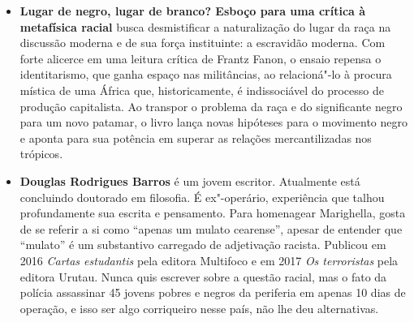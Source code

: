 \begin{itemize}


\item \textbf{Lugar de negro, lugar de branco? Esboço para uma crítica à metafísica racial} busca desmistificar a naturalização do lugar da raça na discussão moderna e de sua força instituinte: a escravidão moderna. Com forte alicerce em uma leitura crítica de Frantz Fanon, o ensaio repensa o identitarismo, que ganha espaço nas militâncias, ao relacioná"-lo à procura mística de uma África que, historicamente, é indissociável do processo de produção capitalista.
 Ao transpor o problema da raça e do significante negro para um novo patamar, o livro lança novas hipóteses para o movimento negro e aponta para sua potência em superar as relações mercantilizadas nos trópicos.
  
\item \textbf{Douglas Rodrigues Barros} é um jovem escritor. Atualmente está concluindo doutorado
em filosofia. É ex"-operário, experiência que talhou profundamente sua escrita e
pensamento. Para homenagear Marighella, gosta de se referir a si como ``apenas um
mulato cearense'', apesar de entender que ``mulato'' é um substantivo carregado de
adjetivação racista. Publicou em 2016 \emph{Cartas estudantis} pela editora Multifoco e em
2017 \emph{Os terroristas} pela editora Urutau. Nunca quis escrever sobre a questão racial, mas
o fato da polícia assassinar 45 jovens pobres e negros da periferia em apenas 10 dias de
operação, e isso ser algo corriqueiro nesse país, não lhe deu alternativas.

\end{itemize}